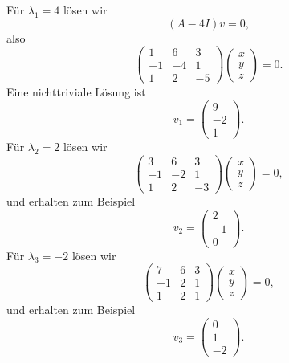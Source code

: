 \begin{calculationbox}
Für $\lambda_1=4$ lösen wir
\[
    (A-4I)v=0,
\]
also
\[
    \begin{pmatrix}
        1&6&3\\
        -1&-4&1\\
        1&2&-5
    \end{pmatrix}
    \begin{pmatrix}x\\y\\z\end{pmatrix}=0.
\]
Eine nichttriviale Lösung ist
\[
    v_1=\begin{pmatrix}9\\-2\\1\end{pmatrix}.
\]
Für $\lambda_2=2$ lösen wir
\[
    \begin{pmatrix}
        3&6&3\\
        -1&-2&1\\
        1&2&-3
    \end{pmatrix}
    \begin{pmatrix}x\\y\\z\end{pmatrix}=0,
\]
und erhalten zum Beispiel
\[
    v_2=\begin{pmatrix}2\\-1\\0\end{pmatrix}.
\]
Für $\lambda_3=-2$ lösen wir
\[
    \begin{pmatrix}
        7&6&3\\
        -1&2&1\\
        1&2&1
    \end{pmatrix}
    \begin{pmatrix}x\\y\\z\end{pmatrix}=0,
\]
und erhalten zum Beispiel
\[
    v_3=\begin{pmatrix}0\\1\\-2\end{pmatrix}.
\]
\end{calculationbox}

